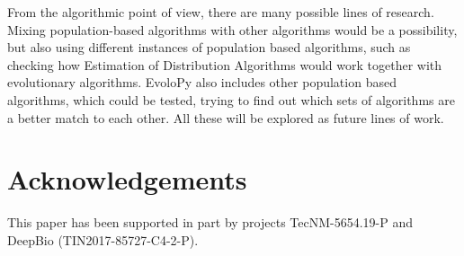 \documentclass[review]{elsarticle}
\begin{document}
From the algorithmic point of view, there are many possible lines of
research. Mixing population-based algorithms with other algorithms
would be a possibility, but also using different instances of
population based algorithms, such as checking how Estimation of
Distribution Algorithms would work together with evolutionary
algorithms. EvoloPy also includes other population based algorithms,
which could be tested, trying to find out which sets of algorithms are
a better match to each other. All these will be explored as future
lines of work.

\section{Acknowledgements}

This paper has been supported in part by projects TecNM-5654.19-P and DeepBio
(TIN2017-85727-C4-2-P).




\end{document}
